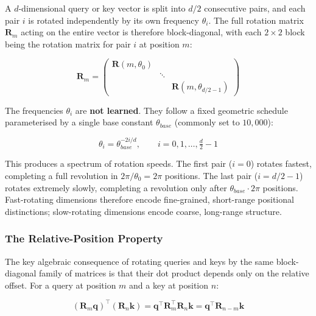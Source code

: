 \documentclass{book}
\begin{document}
A $d$-dimensional query or key vector is split into $d/2$ consecutive pairs,
and each pair $i$ is rotated independently by its own frequency $\theta_i$.
The full rotation matrix $\mathbf{R}_m$ acting on the entire vector is
therefore block-diagonal, with each $2 \times 2$ block being the rotation
matrix for pair $i$ at position $m$:
 
\begin{equation}
\mathbf{R}_m =
\begin{pmatrix}
\mathbf{R}(m,\theta_0) & & \\
& \ddots & \\
& & \mathbf{R}(m,\theta_{d/2-1})
\end{pmatrix}
\end{equation}
 
The frequencies $\theta_i$ are \textbf{not learned}. They follow a fixed
geometric schedule parameterised by a single base constant
$\theta_{base}$ (commonly set to $10{,}000$):
 
\begin{equation}
\theta_i = \theta_{base}^{-2i/d}, \qquad i = 0, 1, \ldots, \tfrac{d}{2} - 1
\end{equation}
 
This produces a spectrum of rotation speeds. The first pair ($i=0$) rotates
fastest, completing a full revolution in $2\pi / \theta_0 = 2\pi$ positions.
The last pair ($i = d/2 - 1$) rotates extremely slowly, completing a
revolution only after $\theta_{base}^{} \cdot 2\pi$ positions. Fast-rotating
dimensions therefore encode fine-grained, short-range positional distinctions;
slow-rotating dimensions encode coarse, long-range structure. 
 
\subsubsection*{The Relative-Position Property}
 
The key algebraic consequence of rotating queries and keys by the same
block-diagonal family of matrices is that their dot product depends only on
the relative offset. For a query at position $m$ and a key at position $n$:
 
\begin{equation}
\left(\mathbf{R}_m \mathbf{q}\right)^\top
\left(\mathbf{R}_n \mathbf{k}\right)
= \mathbf{q}^\top \mathbf{R}_m^\top \mathbf{R}_n \mathbf{k}
= \mathbf{q}^\top \mathbf{R}_{n-m} \mathbf{k}
\end{equation}
 
\end{document}
